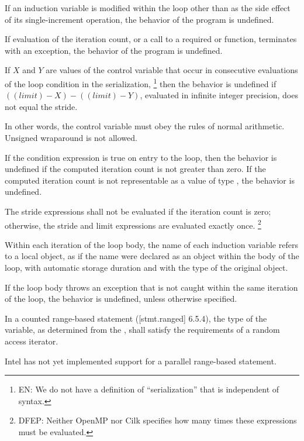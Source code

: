 
If an induction variable is modified within the loop
other than as the side effect of its single-increment operation,
the behavior of the program is undefined.%

\begin{cpp}
If evaluation of the iteration count,
or a call to a required
or
function,
terminates with an exception,
the behavior of the program is undefined.
\end{cpp}

If $X$ and $Y$ are values of the control variable
that occur in consecutive evaluations of the loop condition
in the serialization,%
\footnote{EN:
We do not have a definition of ``serialization''
that is independent of syntax.
}
then the behavior is undefined if
$((limit) - X) - ((limit) - Y)$,
evaluated in infinite integer precision,
does not equal the stride.

\begin{note}
In other words, the control variable must obey the rules of normal arithmetic.
Unsigned wraparound is not allowed.
\end{note}

If the condition expression is true on entry to the loop,
then the behavior is undefined
if the computed iteration count is not greater than zero.
If the computed iteration count is not representable
as a value of type
,
the behavior is undefined.


The stride expressions shall not be evaluated if the iteration count is zero;
otherwise,
the stride and limit expressions are evaluated exactly once.%
\footnote{DFEP:
Neither OpenMP nor Cilk specifies
how many times these expressions must be evaluated.
}

Within each iteration of the loop body,
the name of each induction variable refers to a local object,
as if the name were declared as an object within the body of the loop,
with automatic storage duration and with the type of the original object.
\begin{cpp}
If the loop body throws an exception
that is not caught within the same iteration of the loop,
the behavior is undefined, unless otherwise specified.
\end{cpp}

\begin{cpp}
In a counted range-based
statement ([stmt.ranged] 6.5.4),
the type of the
variable,
as determined from the
,
shall satisfy the requirements of a random access iterator.
\begin{note}
Intel has not yet implemented support for
a parallel range-based
statement.
\end{note}
\end{cpp}
